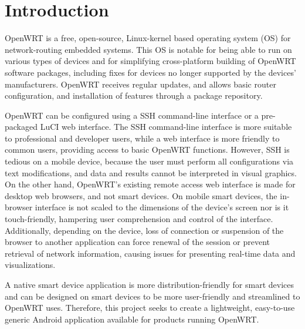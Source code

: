 \section{Introduction}
	
OpenWRT is a free, open-source, Linux-kernel based operating system (OS) for network-routing embedded systems. This OS is notable for being able to run on various types of devices and for simplifying cross-platform building of OpenWRT software packages, including fixes for devices no longer supported by the devices' manufacturers. OpenWRT receives regular updates, and allows basic router configuration, and installation of features through a package repository.
	
OpenWRT can be configured using a SSH command-line interface or a pre-packaged LuCI web interface. The SSH command-line interface is more suitable to professional and developer users, while a web interface is more friendly to common users, providing access to basic OpenWRT functions. However, SSH is tedious on a mobile device, because the user must perform all configurations via text modifications, and data and results cannot be interpreted in visual graphics. On the other hand, OpenWRT's existing remote access web interface is made for desktop web browsers, and not smart devices. On mobile smart devices, the in-browser interface is not scaled to the dimensions of the device's screen nor is it touch-friendly, hampering user comprehension and control of the interface. Additionally, depending on the device, loss of connection or suspension of the browser to another application can force renewal of the session or prevent retrieval of network information, causing issues for presenting real-time data and visualizations.
	
A native smart device application is more distribution-friendly for smart devices and can be designed on smart devices to be more user-friendly and streamlined to OpenWRT uses. Therefore, this project seeks to create a lightweight, easy-to-use generic Android application available for products running OpenWRT.
